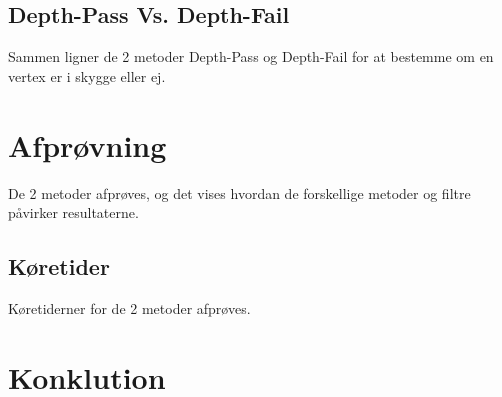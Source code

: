 \documentclass[11pt,a4paper]{article}
\begin{document}
\subsection{Depth-Pass Vs. Depth-Fail}
Sammen ligner de 2 metoder Depth-Pass og Depth-Fail for at bestemme om en vertex er i skygge eller ej.


\section{Afprøvning}
 De 2 metoder afprøves, og det vises hvordan de forskellige metoder og filtre påvirker resultaterne.	

\subsection{Køretider}
Køretiderner for de 2 metoder afprøves.

\section{Konklution}
\end{document}
